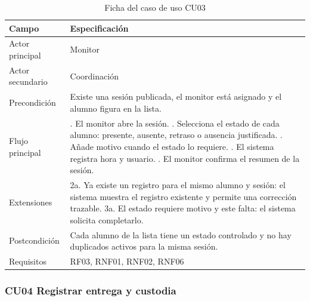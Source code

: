 \begin{table}[H]
\centering\small
\begin{tabularx}{\textwidth}{>{\hsize=0.381\hsize\raggedright\arraybackslash}X>{\hsize=1.619\hsize\raggedright\arraybackslash}X}
\toprule
\rowcolor{cabeceratabla} \textbf{Campo} & \textbf{Especificación} \\
\midrule
Actor principal & Monitor \\
Actor secundario & Coordinación \\
Precondición & Existe una sesión publicada, el monitor está asignado y el alumno figura en la lista. \\
Flujo principal & 1. El monitor abre la sesión. \newline 2. Selecciona el estado de cada alumno: presente, ausente, retraso o ausencia justificada. \newline 3. Añade motivo cuando el estado lo requiere. \newline 4. El sistema registra hora y usuario. \newline 5. El monitor confirma el resumen de la sesión. \\
Extensiones & 2a. Ya existe un registro para el mismo alumno y sesión: el sistema muestra el registro existente y permite una corrección trazable. \newline 3a. El estado requiere motivo y este falta: el sistema solicita completarlo. \\
Postcondición & Cada alumno de la lista tiene un estado controlado y no hay duplicados activos para la misma sesión. \\
Requisitos & RF03, RNF01, RNF02, RNF06 \\
\bottomrule
\end{tabularx}
\caption{Ficha del caso de uso CU03}\label{tab:27}
\end{table}

\subsubsection{CU04 Registrar entrega y custodia}\label{sec:4-1-2-4}

